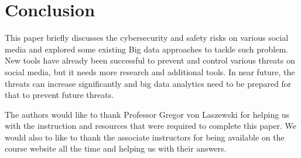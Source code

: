 \documentclass[sigconf]{acmart}
\begin{document}
\section{Conclusion}
This paper briefly discusses the cybersecurity and safety risks on various social media and explored some existing Big data approaches to tackle such problem. New tools have already been successful to prevent and control various threats on social media, but it needs more research and additional tools. In near future, the threats can increase significantly and big data analytics need to be prepared for that to prevent future threats.



\begin{acks}

The authors would like to thank Professor Gregor von Laszewski for helping us with the instruction and resources that were required to complete this paper. We would also to like to thank the associate instructors for being available on the course website all the time and helping us with their answers.

\end{acks}




 
\end{document}

